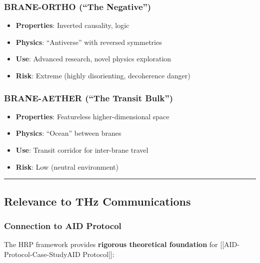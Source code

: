 \subsubsection{BRANE-ORTHO (``The
Negative'')}\label{brane-ortho-the-negative}

\begin{itemize}
\tightlist
\item
  \textbf{Properties}: Inverted causality, logic
\item
  \textbf{Physics}: ``Antiverse'' with reversed symmetries
\item
  \textbf{Use}: Advanced research, novel physics exploration
\item
  \textbf{Risk}: Extreme (highly disorienting, decoherence danger)
\end{itemize}

\subsubsection{BRANE-AETHER (``The Transit
Bulk'')}\label{brane-aether-the-transit-bulk}

\begin{itemize}
\tightlist
\item
  \textbf{Properties}: Featureless higher-dimensional space
\item
  \textbf{Physics}: ``Ocean'' between branes
\item
  \textbf{Use}: Transit corridor for inter-brane travel
\item
  \textbf{Risk}: Low (neutral environment)
\end{itemize}

\begin{center}\rule{0.5\linewidth}{0.5pt}\end{center}

\subsection{Relevance to THz
Communications}\label{relevance-to-thz-communications}

\subsubsection{Connection to AID
Protocol}\label{connection-to-aid-protocol}

The HRP framework provides \textbf{rigorous theoretical foundation} for
{[}{[}AID-Protocol-Case-Study\textbar AID Protocol{]}{]}:


